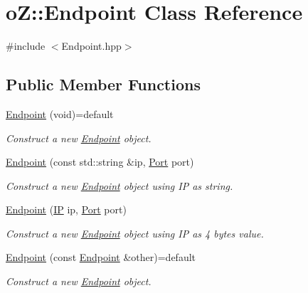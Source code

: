 \hypertarget{classo_z_1_1_endpoint}{}\section{oZ\+::Endpoint Class Reference}
\label{classo_z_1_1_endpoint}


{\ttfamily \#include $<$Endpoint.\+hpp$>$}

\subsection*{Public Member Functions}
\begin{DoxyCompactItemize}
\item 
\mbox{\hyperlink{classo_z_1_1_endpoint_aa0e46ff6f1b744e9173a97680e2e20a6}{Endpoint}} (void)=default
\begin{DoxyCompactList}\small\item\em Construct a new \mbox{\hyperlink{classo_z_1_1_endpoint}{Endpoint}} object. \end{DoxyCompactList}\item 
\mbox{\hyperlink{classo_z_1_1_endpoint_ac7c25299f3e5bc05a54e7906d17fbfd9}{Endpoint}} (const std\+::string \&ip, \mbox{\hyperlink{namespaceo_z_afeccb82d451972ba3b7d2a32b066b30b}{Port}} port)
\begin{DoxyCompactList}\small\item\em Construct a new \mbox{\hyperlink{classo_z_1_1_endpoint}{Endpoint}} object using IP as string. \end{DoxyCompactList}\item 
\mbox{\hyperlink{classo_z_1_1_endpoint_a7dd91554b61824eac5e0b015fa12f957}{Endpoint}} (\mbox{\hyperlink{namespaceo_z_ace55c2d0182a14ceea9649d0d0cf9c4a}{IP}} ip, \mbox{\hyperlink{namespaceo_z_afeccb82d451972ba3b7d2a32b066b30b}{Port}} port)
\begin{DoxyCompactList}\small\item\em Construct a new \mbox{\hyperlink{classo_z_1_1_endpoint}{Endpoint}} object using IP as 4 bytes value. \end{DoxyCompactList}\item 
\mbox{\hyperlink{classo_z_1_1_endpoint_a71e0ae21c68532120f0aa6a988594279}{Endpoint}} (const \mbox{\hyperlink{classo_z_1_1_endpoint}{Endpoint}} \&other)=default
\begin{DoxyCompactList}\small\item\em Construct a new \mbox{\hyperlink{classo_z_1_1_endpoint}{Endpoint}} object. \end{DoxyCompactList}\item 

\end{DoxyCompactItemize}
